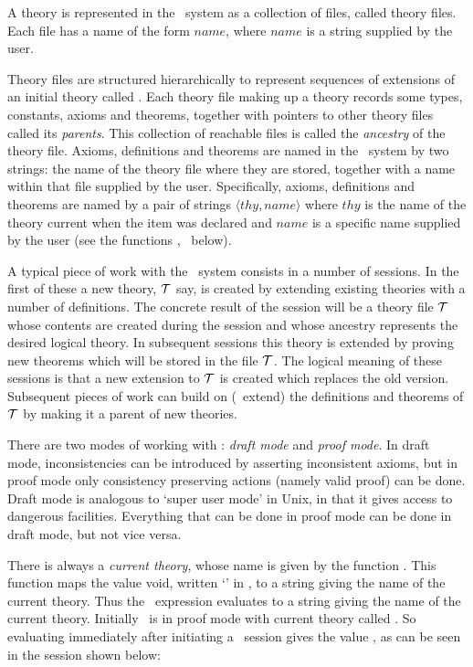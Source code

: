 {A theory is represented in the \HOL\  system as  a collection  of files, called
theory files.  Each file has a name of the form $name$, where $name$ is
a string supplied by the user.

Theory files are structured hierarchically to represent sequences of extensions of
an initial theory called .
Each theory file making up a theory records
some types, constants, axioms and
theorems, together with
pointers to other theory files called its {\it parents\/}. 
This collection of reachable files is called the {\it
ancestry\/} of the theory file. Axioms, definitions
and theorems are named in the \HOL\ system by two strings: the name of the theory
file where they are stored, together with a name within that file supplied by the
user.
Specifically,
axioms, definitions and theorems
are named by a pair of strings $\langle thy,name\rangle$ 
where $thy$ is the name of the
theory current when the item was declared and $name$
is a specific name supplied by the user (see the functions
,  \etc\ below).

A typical piece of work with the \HOL\ system consists in a number of sessions. In
the first of these a new theory, ${\cal T}$ say, is created by extending existing
theories with a number of definitions. The concrete result of the session will be a
theory file ${\cal T}$ whose contents are created during the
session and whose ancestry represents the desired logical theory.  In subsequent
sessions this theory is extended by proving new theorems which will be stored in
the file ${\cal T}$. The logical meaning of these sessions is that a new
extension to ${\cal T}$ is created which replaces the old version.  Subsequent
pieces of work can build on (\ie\ extend) the definitions and theorems of ${\cal
T}$ by making it a parent of new theories.

There are two modes of working with \HOL:   {\it  draft mode\/}  and {\it proof
mode\/}.  In  draft  mode,  inconsistencies  can  be  introduced  by  asserting
inconsistent axioms,  but  in  proof  mode only  consistency preserving actions
(namely valid proof) can be done.  Draft mode is analogous to `super user mode'
in Unix, in that it gives access to dangerous facilities.   Everything that can
be done in proof mode can be done in draft mode, but not vice versa.

There is always a {\it current theory\/}, whose name  is given  by the function
.  This function maps the value void, written
`\ml{()}' in \ML, to a string giving the name of the current theory.
Thus the \ML\ expression
 evaluates to a string giving the name of the current
theory.  Initially  \HOL\  is in  proof mode  with current theory
called .  So evaluating  immediately after
initiating a \HOL\ session gives the value , as can be seen in
the session shown below:


}
